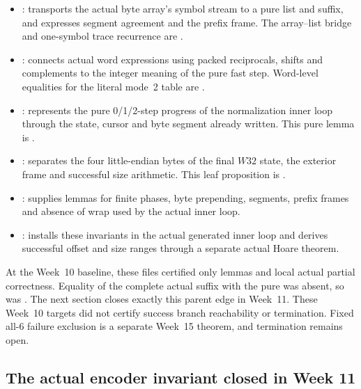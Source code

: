\begin{itemize}
  \item {}: transports the actual byte
        array's symbol stream to a pure list and suffix, and expresses segment
        agreement and the prefix frame. The array--list bridge and one-symbol
        trace recurrence are \statusproved.
  \item {}: connects actual word
        expressions using packed reciprocals, shifts and complements to the
        integer meaning of the pure fast step. Word-level equalities for the
        literal mode~2 table are \statusproved.
  \item {}: represents the pure
        0/1/2-step progress of the normalization inner loop through the state,
        cursor and byte segment already written. This pure lemma is \statusproved.
  \item {}: separates the four
        little-endian bytes of the final \(W32\) state, the exterior frame and
        successful size arithmetic. This leaf proposition is \statusproved.
  \item {}: supplies lemmas for finite
        phases, byte prepending, segments, prefix frames and absence of wrap
        used by the actual inner loop.
  \item {}: installs these invariants
        in the actual generated  inner loop and derives
        successful offset and size ranges through a separate actual Hoare theorem.
\end{itemize}

\begin{caution}
At the Week~10 baseline, these files certified only lemmas and local actual
partial correctness. Equality of the complete actual suffix with the pure
 was absent, so
 was \statuspartial. The next section closes
exactly this parent edge in Week~11. These Week~10 targets did not certify success
branch reachability or termination. Fixed all-6 failure exclusion is a separate
Week~15 theorem, and termination remains open.
\end{caution}

\subsection{The actual encoder invariant closed in Week 11}

